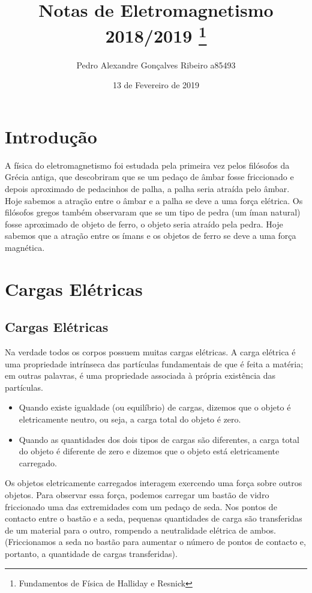 \documentclass{article}
\title{Notas de Eletromagnetismo 2018/2019 \thanks{Fundamentos de Física de Halliday e Resnick}}
\author{Pedro Alexandre Gonçalves Ribeiro a85493}
\date{13 de Fevereiro de 2019}
\begin{document}
\maketitle
\tableofcontents
\newpage
\section{Introdução}
A física do eletromagnetismo foi estudada pela primeira vez pelos filósofos da Grécia antiga, que descobriram que se um pedaço de âmbar fosse friccionado e depois aproximado de pedacinhos de palha, a palha seria atraída pelo âmbar. Hoje sabemos a atração entre o âmbar e a palha se deve a uma força elétrica. Os filósofos gregos também observaram que se um tipo de pedra (um íman natural) fosse aproximado de objeto de ferro, o objeto seria atraído pela pedra. Hoje sabemos que a atração entre os ímans e os objetos de ferro se deve a uma força magnética.
\section{Cargas Elétricas}
\subsection{Cargas Elétricas}
Na verdade todos os corpos possuem muitas cargas elétricas. A carga elétrica é uma propriedade intrínseca das partículas fundamentais de que é feita a matéria; em outras palavras, é uma propriedade associada à própria existência das partículas.
\begin{itemize}
\item Quando existe igualdade (ou equilíbrio) de cargas, dizemos que o objeto é eletricamente neutro, ou seja, a carga total do objeto é zero.
\item Quando as quantidades dos dois tipos de cargas são diferentes, a carga total do objeto é diferente de zero e dizemos que o objeto está eletricamente carregado.
\end{itemize}
Os objetos eletricamente carregados interagem exercendo uma força sobre outros objetos. Para observar essa força, podemos carregar um bastão de vidro friccionado uma das extremidades com um pedaço de seda. Nos pontos de contacto entre o bastão e a seda, pequenas quantidades de carga são transferidas de um material para o outro, rompendo a neutralidade elétrica de ambos. (Friccionamos a seda no bastão para aumentar o número de pontos de contacto e, portanto, a quantidade de cargas transferidas).
\end{document}
